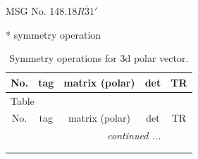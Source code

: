 \documentclass[fleqn,8pt]{jsarticle}
\begin{document}
\setcounter{MaxMatrixCols}{32}

\renewcommand{\tablename}{Table~}
\renewcommand{\figurename}{Figure~}
\begin{center}
\LARGE
MSG No. 148.18\quad$R\bar{3}1'$
\end{center}
* symmetry operation
\renewcommand{\arraystretch}{1.3}
\begin{longtable}{ccccc}
\caption{Symmetry operations for 3d polar vector.}
 \\
 \hline \hline
No. & tag & matrix (polar) & det & TR \\ \hline \endfirsthead

\multicolumn{4}{l}{\tablename\ \thetable{}} \\
 \hline \hline
No. & tag & matrix (polar) & det & TR \\ \hline \endhead

 \hline \hline
\multicolumn{4}{r}{\footnotesize\it continued ...} \\ \endfoot

 \hline \hline
\multicolumn{4}{r}{} \\ \endlastfoot


\end{longtable}
\end{document}
